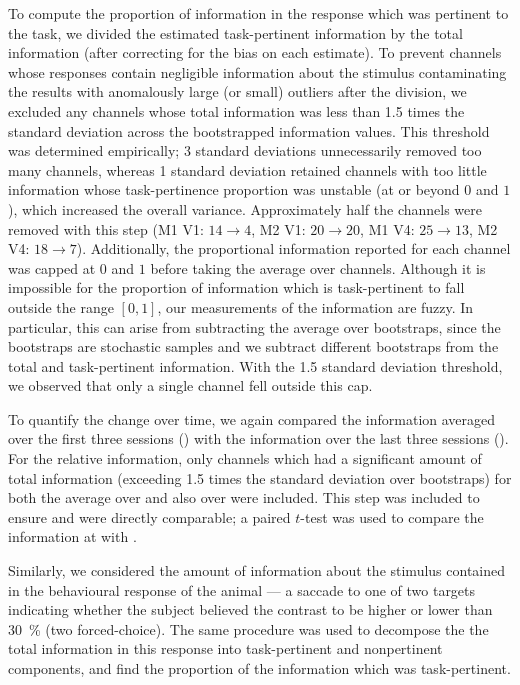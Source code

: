 To compute the proportion of information in the response which was pertinent to the task, we divided the estimated task-pertinent information by the total information (after correcting for the bias on each estimate).
To prevent channels whose responses contain negligible information about the stimulus contaminating the results with anomalously large (or small) outliers after the division, we excluded any channels whose total information was less than \num{1.5} times the standard deviation across the bootstrapped information values.
This threshold was determined empirically; \num{3} standard deviations unnecessarily removed too many channels, whereas \num{1} standard deviation retained channels with too little information whose task-pertinence proportion was unstable (at or beyond $0$ and $1$), which increased the overall variance.
Approximately half the channels were removed with this step (\ac{M1} \ac{V1}: $14\to4$, \ac{M2} \ac{V1}: $20\to20$, \ac{M1} \ac{V4}: $25\to13$, \ac{M2} \ac{V4}: $18\to7$).
Additionally, the proportional information reported for each channel was capped at $0$ and $1$ before taking the average over channels.
Although it is impossible for the proportion of information which is task-pertinent to fall outside the range $[0, 1]$, our measurements of the information are fuzzy.
In particular, this can arise from subtracting the average over bootstraps, since the bootstraps are stochastic samples and we subtract different bootstraps from the total and task-pertinent information.
With the \num{1.5} standard deviation threshold, we observed that only a single channel fell outside this cap.

To quantify the change over time, we again compared the information averaged over the first three sessions () with the information over the last three sessions ().
For the relative information, only channels which had a significant amount of total information (exceeding \num{1.5} times the standard deviation over bootstraps) for both the average over  and also over  were included.
This step was included to ensure  and  were directly comparable; a paired $t$-test was used to compare the information at  with .

Similarly, we considered the amount of information about the stimulus contained in the behavioural response of the animal --- a saccade to one of two targets indicating whether the subject believed the contrast to be higher or lower than \SI{30}{\percent} (two forced-choice).
The same procedure was used to decompose the the total information in this response into task-pertinent and nonpertinent components, and find the proportion of the information which was task-pertinent.



